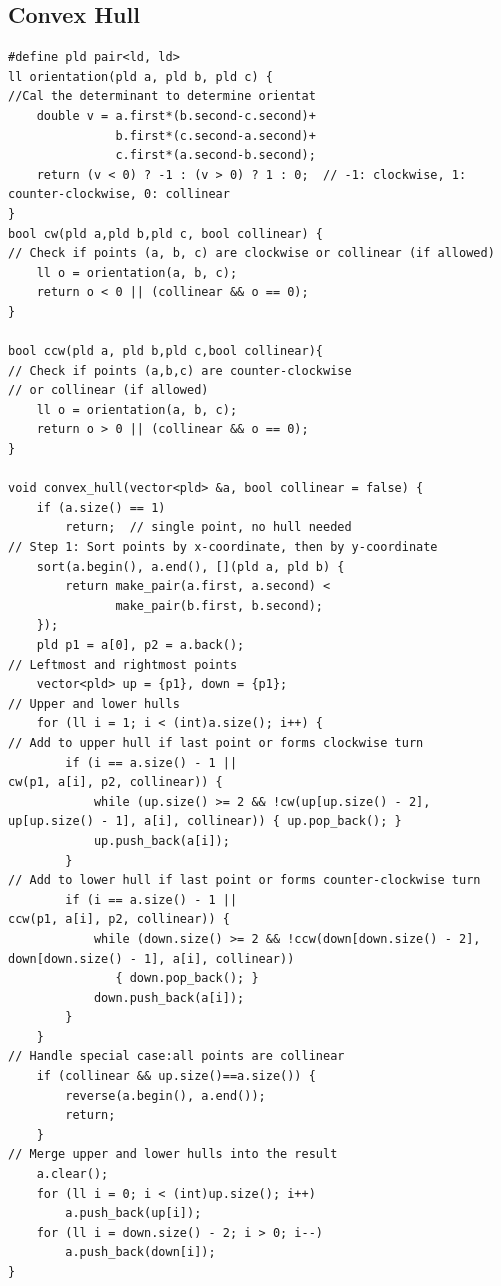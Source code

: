 \subsection{Convex Hull}
\begin{lstlisting}
#define pld pair<ld, ld>
ll orientation(pld a, pld b, pld c) {
//Cal the determinant to determine orientat
    double v = a.first*(b.second-c.second)+
               b.first*(c.second-a.second)+
               c.first*(a.second-b.second);
    return (v < 0) ? -1 : (v > 0) ? 1 : 0;  // -1: clockwise, 1: counter-clockwise, 0: collinear
}
bool cw(pld a,pld b,pld c, bool collinear) {
// Check if points (a, b, c) are clockwise or collinear (if allowed)
    ll o = orientation(a, b, c);
    return o < 0 || (collinear && o == 0);
}

bool ccw(pld a, pld b,pld c,bool collinear){
// Check if points (a,b,c) are counter-clockwise
// or collinear (if allowed)
    ll o = orientation(a, b, c);
    return o > 0 || (collinear && o == 0);
}

void convex_hull(vector<pld> &a, bool collinear = false) {
    if (a.size() == 1)
        return;  // single point, no hull needed
// Step 1: Sort points by x-coordinate, then by y-coordinate
    sort(a.begin(), a.end(), [](pld a, pld b) {
        return make_pair(a.first, a.second) <
               make_pair(b.first, b.second);
    });
    pld p1 = a[0], p2 = a.back();
// Leftmost and rightmost points
    vector<pld> up = {p1}, down = {p1};
// Upper and lower hulls
    for (ll i = 1; i < (int)a.size(); i++) {
// Add to upper hull if last point or forms clockwise turn
        if (i == a.size() - 1 ||
cw(p1, a[i], p2, collinear)) {
            while (up.size() >= 2 && !cw(up[up.size() - 2], up[up.size() - 1], a[i], collinear)) { up.pop_back(); }
            up.push_back(a[i]);
        }
// Add to lower hull if last point or forms counter-clockwise turn
        if (i == a.size() - 1 ||
ccw(p1, a[i], p2, collinear)) {
            while (down.size() >= 2 && !ccw(down[down.size() - 2], down[down.size() - 1], a[i], collinear))
               { down.pop_back(); }
            down.push_back(a[i]);
        }
    }
// Handle special case:all points are collinear
    if (collinear && up.size()==a.size()) {
        reverse(a.begin(), a.end());
        return;
    }
// Merge upper and lower hulls into the result
    a.clear();
    for (ll i = 0; i < (int)up.size(); i++)
        a.push_back(up[i]);
    for (ll i = down.size() - 2; i > 0; i--)
        a.push_back(down[i]);
}
\end{lstlisting}
